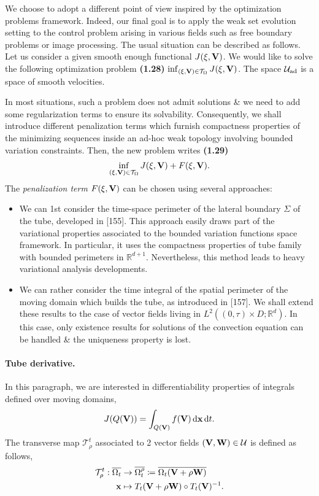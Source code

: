 \documentclass[oneside]{book}
\numberwithin{equation}{section}
\begin{document}
We choose to adopt a different point of view inspired by the optimization problems framework. Indeed, our final goal is to apply the weak set evolution setting to the control problem arising in various fields such as free boundary problems or image processing. The usual situation can be described as follows. Let us consider a given smooth enough functional $J(\xi,{\bf V})$. We would like to solve the following optimization problem \textbf{(1.28)} $\inf_{(\xi,{\bf V})\in\mathcal{T}_\Omega} J(\xi,{\bf V})$. The space $\mathcal{U}_{\rm ad}$ is a space of smooth velocities.

In most situations, such a problem does not admit solutions \& we need to add some regularization terms to ensure its solvability. Consequently, we shall introduce different penalization terms which furnish compactness properties of the minimizing sequences inside an ad-hoc weak topology involving bounded variation constraints. Then, the new problem writes \textbf{(1.29)}
\begin{align*}
	\inf_{(\xi,{\bf V})\in\mathcal{T}_\Omega} J(\xi,{\bf V}) + F(\xi,{\bf V}).
\end{align*}
The \textit{penalization term} $F(\xi,{\bf V})$ can be chosen using several approaches:
\begin{itemize}
	\item We can 1st consider the time-space perimeter of the lateral boundary $\Sigma$ of the tube, developed in [155]. This approach easily draws part of the variational properties associated to the bounded variation functions space framework. In particular, it uses the compactness properties of tube family with bounded perimeters in $\mathbb{R}^{d+1}$. Nevertheless, this method leads to heavy variational analysis developments.
	\item We can rather consider the time integral of the spatial perimeter of the moving domain which builds the tube, as introduced in [157]. We shall extend these results to the case of vector fields living in $L^2((0,\tau)\times D;\mathbb{R}^d)$. In this case, only existence results for solutions of the convection equation can be handled \& the uniqueness property is lost.
\end{itemize}

\paragraph{Tube derivative.} In this paragraph, we are interested in differentiability properties of integrals defined over moving domains,
\begin{align*}
	J(Q({\bf V})) = \int_{Q({\bf V})} f({\bf V})\,{\rm d}{\bf x}\,{\rm d}t.
\end{align*}
The transverse map $\mathcal{T}_\rho^t$ associated to 2 vector fields $({\bf V},{\bf W})\in\mathcal{U}$ is defined as follows,
\begin{align*}
	\mathcal{T}_\rho^t:\overline{\Omega_t}&\to\overline{\Omega_t^\rho}\coloneqq\overline{\Omega_t({\bf V} + \rho{\bf W})}\\
	{\bf x}&\mapsto T_t({\bf V} + \rho{\bf W})\circ T_t({\bf V})^{-1}.
\end{align*}
\end{document}
